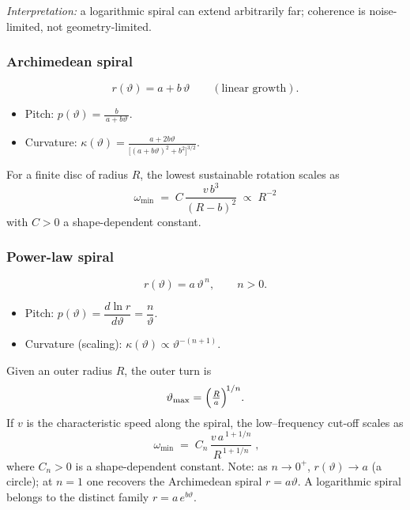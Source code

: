 \emph{Interpretation:} a logarithmic spiral can extend arbitrarily far; coherence is noise-limited, not geometry-limited.

\subsubsection*{Archimedean spiral}

\begin{equation}
  r(\vartheta) = a + b\,\vartheta \qquad (\text{linear growth}).
\end{equation}

\begin{itemize}[leftmargin=1.5em]
  \item Pitch: \(\displaystyle p(\vartheta)=\frac{b}{\,a+b\vartheta\,}.\)
  \item Curvature: \(\displaystyle
    \kappa(\vartheta)
    = \frac{a + 2b\vartheta}
           {\bigl[(a+b\vartheta)^{2}+b^{2}\bigr]^{3/2}}.\)
\end{itemize}

For a finite disc of radius \(R\), the lowest sustainable rotation scales as
\begin{equation}
  \boxed{\;
    \omega_{\min}
    \;=\; C\,\frac{v\,b^{3}}{(R - b)^{2}}
    \;\propto\; R^{-2}
  \;}
\end{equation}
with \(C>0\) a shape-dependent constant.

\subsubsection*{Power-law spiral}

\begin{equation}
  r(\vartheta) = a\,\vartheta^{\,n}, \qquad n>0.
\end{equation}

\begin{itemize}[leftmargin=1.5em]
  \item Pitch: \(p(\vartheta)=\dfrac{d\ln r}{d\vartheta}=\dfrac{n}{\vartheta}\).
  \item Curvature (scaling): \(\kappa(\vartheta)\propto \vartheta^{-(n+1)}\).
\end{itemize}

Given an outer radius \(R\), the outer turn is
\begin{equation}
  \vartheta_{\max}=\Bigl(\tfrac{R}{a}\Bigr)^{\!1/n}.
\end{equation}
If \(v\) is the characteristic speed along the spiral, the low–frequency cut-off scales as
\begin{equation}
  \boxed{\;
    \omega_{\min}
    \;=\; C_{n}\,\frac{v\,a^{\,1+1/n}}{R^{\,1+1/n}}
    \;},
\end{equation}
where \(C_n>0\) is a shape-dependent constant. Note: as \(n\to 0^{+}\), \(r(\vartheta)\to a\) (a circle); at \(n=1\) one recovers the Archimedean spiral \(r=a\vartheta\). A logarithmic spiral belongs to the distinct family \(r=a\,e^{b\vartheta}\).

